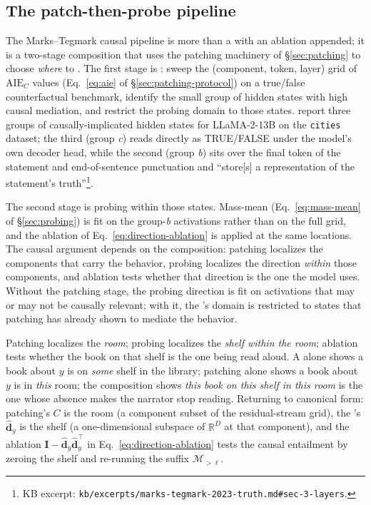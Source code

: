 \subsection{The patch-then-probe pipeline}
\label{sec:patch-then-probe}

The Marks--Tegmark causal pipeline is more than a  with an
ablation appended; it is a two-stage composition that uses the
patching machinery of \S\ref{sec:patching} to choose \emph{where} to
. The first stage is : sweep the
(component, token, layer) grid of $\mathrm{AIE}_C$ values
(Eq.~\ref{eq:aie} of \S\ref{sec:patching-protocol}) on a
true/false counterfactual benchmark, identify the small group of
hidden states with high causal mediation, and restrict the probing
domain to those states. \citet[\S 3]{marks-tegmark-2023-truth} report
three groups of causally-implicated hidden states for LLaMA-2-13B on
the \texttt{cities} dataset; the third (group \emph{c}) reads
directly as TRUE/FALSE under the model's own decoder head, while the
second (group \emph{b}) sits over the final token of the statement
and end-of-sentence punctuation and ``store[s] a representation of
the statement's truth''\footnote{KB excerpt:
\nolinkurl{kb/excerpts/marks-tegmark-2023-truth.md#sec-3-layers}.}.

The second stage is probing within those states. Mass-mean
(Eq.~\ref{eq:mass-mean} of \S\ref{sec:probing}) is fit on the
group-\emph{b} activations rather than on the full grid, and the
ablation of Eq.~\eqref{eq:direction-ablation} is applied at the same
locations. The causal argument depends on the composition:
patching localizes the components that carry the
behavior, probing localizes the direction \emph{within} those
components, and ablation tests whether that direction is the one the
model uses. Without the patching stage, the probing direction is
fit on activations that may or may not be causally relevant; with it,
the 's domain is restricted to states that patching has already
shown to mediate the behavior.

\begin{analogy}
Patching localizes the \emph{room}; probing localizes the \emph{shelf
within the room}; ablation tests whether the book on that shelf is
the one being read aloud. A  alone shows a book about $y$ is
on \emph{some} shelf in the library; patching alone shows a book
about $y$ is in \emph{this} room; the composition shows \emph{this
book on this shelf in this room} is the one whose absence makes the
narrator stop reading. Returning to canonical form: patching's $C$ is
the room (a component subset of the residual-stream grid), the
's $\hat{\mathbf{d}}_y$ is the shelf (a one-dimensional
subspace of $\mathbb{R}^D$ at that component), and the ablation
$\mathbf{I} - \hat{\mathbf{d}}_y \hat{\mathbf{d}}_y^\top$ in
Eq.~\eqref{eq:direction-ablation} tests the causal entailment by
zeroing the shelf and re-running the suffix $\mathcal{M}_{>\ell}$.
\end{analogy}

